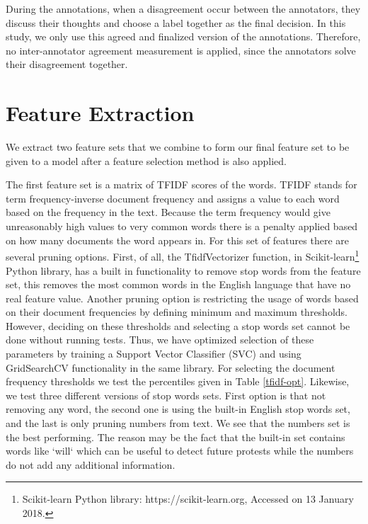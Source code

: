 \documentclass{article}
\begin{document}
During the annotations, when a disagreement occur between the annotators, they discuss their thoughts and choose a label together as the final decision. In this study, we only use this agreed and finalized version of the annotations. Therefore, no inter-annotator agreement measurement is applied, since the annotators solve their disagreement together.

\section{Feature Extraction}

We extract two feature sets that we combine to form our final feature set to be given to a model after a feature selection method is also applied.

The first feature set is a matrix of TFIDF scores of the words. TFIDF stands for term frequency-inverse document frequency and assigns a value to each word based on the frequency in the text. Because the term frequency would give unreasonably high values to very common words there is a penalty applied based on how many documents the word appears in. For this set of features there are several pruning options. First, of all, the TfidfVectorizer function, in Scikit-learn\footnote{Scikit-learn Python library: https://scikit-learn.org, Accessed on 13 January 2018.} Python library, has a built in functionality to remove stop words from the feature set, this removes the most common words in the English language that have no real feature value. Another pruning option is restricting the usage of words based on their document frequencies by defining minimum and maximum thresholds. However, deciding on these thresholds and selecting a stop words set cannot be done without running tests. Thus, we have optimized selection of these parameters by training a Support Vector Classifier (SVC) and using GridSearchCV functionality in the same library. For selecting the document frequency thresholds we test the percentiles given in Table \ref{tfidf-opt}. Likewise, we test three different versions of stop words sets. First option is that not removing any word, the second one is using the built-in English stop words set, and the last is only pruning numbers from text. We see that the numbers set is the best performing. The reason may be the fact that the built-in set contains words like `will` which can be useful to detect future protests while the numbers do not add any additional information.

\end{document}
